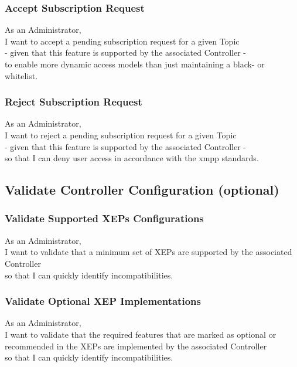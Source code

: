 \subsubsection{Accept Subscription Request}

As an Administrator,\\
I want to accept a pending subscription request for a given Topic\\
- given that this feature is supported by the associated Controller -\\
to enable more dynamic access models than just maintaining a black- or whitelist.

\subsubsection{Reject Subscription Request}

As an Administrator,\\
I want to reject a pending subscription request for a given Topic\\
- given that this feature is supported by the associated Controller -\\
so that I can deny user access in accordance with the \gls{xmpp} standards.

\subsection{Validate Controller Configuration (optional)}\label{sec:validate-controller-config}

\subsubsection{Validate Supported XEPs Configurations}
As an Administrator,\\
I want to validate that a minimum set of XEPs are supported by the associated Controller\\
so that I can quickly identify incompatibilities.

\subsubsection{Validate Optional XEP Implementations}
As an Administrator,\\
I want to validate that the required features that are marked as optional or recommended in the XEPs are implemented by the associated Controller\\
so that I can quickly identify incompatibilities.

